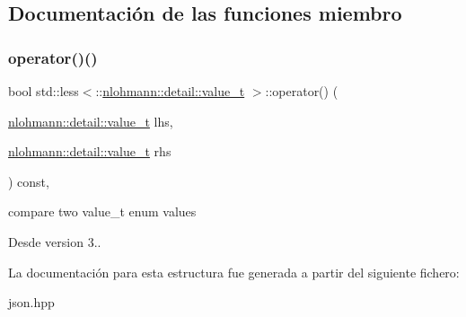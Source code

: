 \subsection{Documentación de las funciones miembro}
\mbox{\label{structstd_1_1less_3_1_1nlohmann_1_1detail_1_1value__t_01_4_a10d3fea50edf7b15ead8f4ceeb006000}} 
\subsubsection{\texorpdfstring{operator()()}{operator()()}}
{\footnotesize\ttfamily bool std\+::less$<$\+::\mbox{\hyperlink{namespacenlohmann_1_1detail_a1ed8fc6239da25abcaf681d30ace4985}{nlohmann\+::detail\+::value\+\_\+t}} $>$\+::operator() (\begin{DoxyParamCaption}\item[{\mbox{\hyperlink{namespacenlohmann_1_1detail_a1ed8fc6239da25abcaf681d30ace4985}{nlohmann\+::detail\+::value\+\_\+t}}}]{lhs,  }\item[{\mbox{\hyperlink{namespacenlohmann_1_1detail_a1ed8fc6239da25abcaf681d30ace4985}{nlohmann\+::detail\+::value\+\_\+t}}}]{rhs }\end{DoxyParamCaption}) const\hspace{0.3cm}{\ttfamily [inline]}, {\ttfamily [noexcept]}}



compare two value\+\_\+t enum values 

\begin{DoxySince}{Desde}
version 3.. 
\end{DoxySince}


La documentación para esta estructura fue generada a partir del siguiente fichero\+:\begin{DoxyCompactItemize}
\item 
json.\+hpp\end{DoxyCompactItemize}
